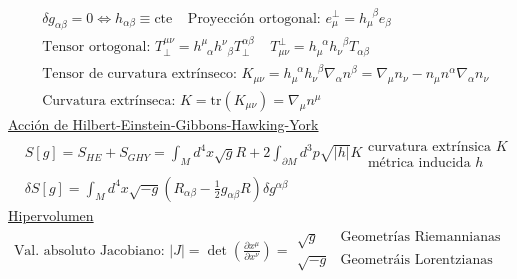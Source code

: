 \begin{align*}
    &\delta g_{\alpha \beta}=0 \Leftrightarrow h_{\alpha\beta} \equiv \text{cte}\; \;\; \; \text{Proyección ortogonal: } e_\mu^\perp = h_\mu^{\; \; \beta}e_\beta\\
    &\text{Tensor ortogonal: }T^{\mu\nu}_\perp= h^\mu_{\;\; \alpha}h^\nu_{\;\;\beta}T^{\alpha\beta}_\perp\; \; \;\; 
    T_{\mu\nu}^\perp= h_\mu^{\;\; \alpha}h_\nu^{\;\;\beta}T_{\alpha\beta}\\
    &\text{Tensor de curvatura extrínseco: } K_{\mu\nu} = h_\mu^{\; \; \alpha}h_\nu^{\; \; \beta}\nabla_\alpha n^\beta=\nabla_\mu n_\nu - n_\mu n^\alpha \nabla_\alpha n_\nu\\
    &\text{Curvatura extrínseca: }K=\text{tr}(K_{\mu\nu})=\nabla_\mu n^\mu
\end{align*}
\underline{Acción de Hilbert-Einstein-Gibbons-Hawking-York}\\
\begin{align*}
    &S[g]=S_{HE} + S_{GHY} = \int_M d^4 x\sqrt{g} R + 2 \int_{\partial M} d^3 p \sqrt{|h|}K \begin{array}{c}
        \text{curvatura extrínsica $K$} \\
        \text{métrica inducida $h$} 
    \end{array}\\
    & \delta S[g]= \int_M d^4 x \sqrt{-g} (R_{\alpha \beta} - \frac{1}{2} g_{\alpha \beta} R)\delta g^{\alpha \beta}
\end{align*}
\underline{Hipervolumen}
\begin{align*}
    \text{Val. absoluto Jacobiano: } |J|= \det \left(\frac{\partial x^\mu }{\partial x^\nu }\right) = \begin{array}{lc}
         \sqrt{g}& \text{Geometrías Riemannianas}  \\
         \sqrt{-g} & \text{Geometráis Lorentzianas}
    \end{array}
\end{align*}
